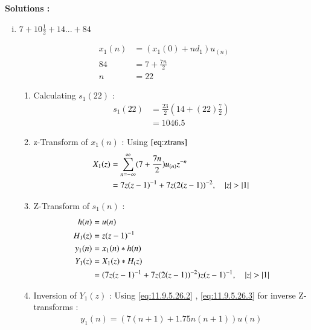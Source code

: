 \documentclass[journal,12pt,onecolumn]{IEEEtran}
\theoremstyle{remark}
\begin{document}
\textbf{Solutions :}

\begin{enumerate}[(i)]
\item
$ 7 + 10\frac{1}{2} + 14 ... + 84$
\vspace{0.5cm}

\begin{align}
x_1(n) &= (x_1(0) + nd_1)u_{(n)}\\
84 &= 7+\frac{7n}{2}\\
n &= 22
\end{align}

\begin{enumerate}[1.]
\item 
Calculating $s_1(22)$ : 
\begin{align}
    s_1{(22)} &= \frac{23}{2}(14+(22)\frac{7}{2})\\
     &= 1046.5
    \end{align}
    
\item 
z-Transform of $x_1(n)$ :
Using $\eqref{eq:ztrans}$
\begin{align}
X_1(z) &= \sum_{n=-\infty}^{\infty}(7 + \frac{7n}{2})u_{(n)}z^{-n} \\
&= 7z(z-1)^{-1} + 7z(2(z-1))^{-2}  \label{eq:ee25-4}
,\quad \left\vert z\right\vert>\left\vert1\right\vert 
\end{align}
\item
Z-Transform of $s_1(n)$ :
\begin{align}
         h(n) &= u(n) \\
                 H_1(z) &= z(z-1)^{-1} \label{eq:ee25-9}\\
    y_1(n) &= x_1(n) * h(n) \\
    Y_1(z) &= X_1(z) * H_(z)\\
 &= (7z(z-1)^{-1}+
7z(2(z-1))^{-2})z(z-1)^{-1}
,\quad \left\vert z\right\vert>\left\vert1\right\vert     
\end{align}
        \item
Inversion of $Y_1(z)$ :
Using \eqref{eq:11.9.5.26.2} , \eqref{eq:11.9.5.26.3} for inverse Z-transforms :
\begin{align}
 y_1(n) = (7(n+1) + 1.75n(n+1))u(n)
\end{align}
\end{enumerate}    


\end{enumerate}
\end{document}
